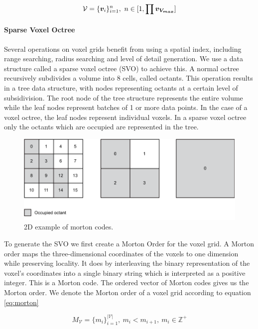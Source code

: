 \begin{equation}
    \label{eq:voxelgrid}
    \mathcal{V}=\{\boldsymbol{v}_{i}\}_{i=1}^{n},\ n \in [1, \prod{\boldsymbol{v_{V_{max}}}}]
\end{equation}


\paragraph{Sparse Voxel Octree}
Several operations on voxel grids benefit from using a spatial index, including range searching, radius searching and level of detail generation. We use a data structure called a sparse voxel octree (SVO) to achieve this. A normal octree recursively subdivides a volume into 8 cells, called octants. This operation results in a tree data structure, with nodes representing octants at a certain level of subsidivision. The root node of the tree structure represents the entire volume while the leaf nodes represent batches of 1 or more data points. In the case of a voxel octree, the leaf nodes represent individual voxels. In a sparse voxel octree only the octants which are occupied are represented in the tree. 

\begin{figure}[h]
    \centering
    \includegraphics*[width=.7\textwidth]{./fig/morton_code.pdf}
    \caption{2D example of morton codes.}
    \label{fig:vg_morton}
\end{figure}

To generate the SVO we first create a Morton Order for the voxel grid. A Morton order maps the three-dimensional coordinates of the voxels to one dimension while preserving locality. It does by interleaving the binary representation of the voxel's coordinates into a single binary string which is interpreted as a positive integer. This is a Morton code. The ordered vector of Morton codes gives us the Morton order. We denote the Morton order of a voxel grid according to equation \ref{eq:morton}

\begin{equation}
    \label{eq:morton}
    M_{\mathcal{V}}=\{m_i\}_{i=1}^{|\mathcal{V}|},\ m_i < m_{i+1},\ m_i \in \mathbb{Z^+}
\end{equation}
    

